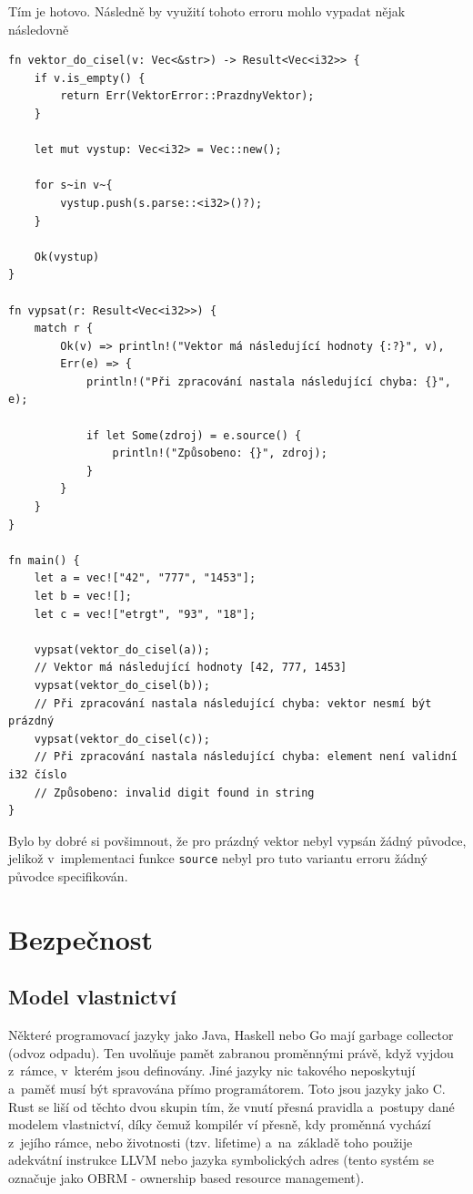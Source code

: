 \documentclass[a4paper, 12pt]{article} %
\newcommand{\rust}[1]{\texttt{#1}}
\begin{document}
            Tím je hotovo. Následně by využití tohoto erroru mohlo vypadat nějak následovně
            \begin{verbatim}
fn vektor_do_cisel(v: Vec<&str>) -> Result<Vec<i32>> {
    if v.is_empty() {
        return Err(VektorError::PrazdnyVektor);
    }

    let mut vystup: Vec<i32> = Vec::new();

    for s~in v~{
        vystup.push(s.parse::<i32>()?);
    }

    Ok(vystup)
}

fn vypsat(r: Result<Vec<i32>>) {
    match r {
        Ok(v) => println!("Vektor má následující hodnoty {:?}", v),
        Err(e) => {
            println!("Při zpracování nastala následující chyba: {}", e);

            if let Some(zdroj) = e.source() {
                println!("Způsobeno: {}", zdroj);
            }
        }
    }
}

fn main() {
    let a = vec!["42", "777", "1453"];
    let b = vec![];
    let c = vec!["etrgt", "93", "18"];

    vypsat(vektor_do_cisel(a));
    // Vektor má následující hodnoty [42, 777, 1453]
    vypsat(vektor_do_cisel(b));
    // Při zpracování nastala následující chyba: vektor nesmí být prázdný
    vypsat(vektor_do_cisel(c));
    // Při zpracování nastala následující chyba: element není validní i32 číslo
    // Způsobeno: invalid digit found in string
}
            \end{verbatim}
            \cite{vice_typu}

            Bylo by dobré si povšimnout, že pro prázdný vektor nebyl vypsán žádný původce, jelikož v~implementaci funkce \rust{source} nebyl pro tuto variantu erroru žádný původce specifikován.


\section{Bezpečnost}
    \hypertarget{vlast}{}

    \subsection{Model vlastnictví}
        Některé programovací jazyky jako Java, Haskell nebo Go mají garbage collector (odvoz odpadu). Ten uvolňuje pamět zabranou proměnnými právě, když vyjdou z~rámce, v~kterém jsou definovány. Jiné jazyky nic takového neposkytují a~paměť musí být spravována přímo programátorem. Toto jsou jazyky jako C. Rust se liší od těchto dvou skupin tím, že vnutí přesná pravidla a~postupy dané modelem vlastnictví, díky čemuž kompilér ví přesně, kdy proměnná vychází z~jejího rámce, nebo životnosti (tzv. lifetime) a~na~základě toho použije adekvátní instrukce LLVM nebo jazyka symbolických adres (tento systém se označuje jako OBRM - ownership based resource management).
        
\end{document}

